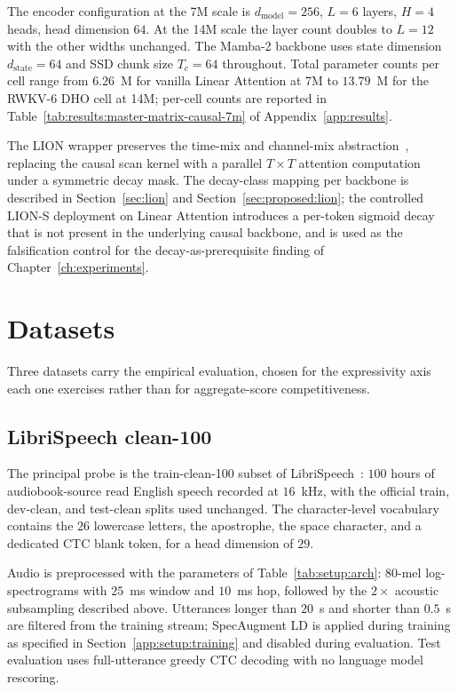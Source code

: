 The encoder configuration at the 7M scale is $d_{\text{model}} = 256$,
$L = 6$ layers, $H = 4$ heads, head dimension $64$. At the 14M
scale the layer count doubles to $L = 12$ with the other widths
unchanged. The Mamba-2 backbone uses state dimension
$d_{\text{state}} = 64$ and SSD chunk size $T_{c} = 64$ throughout.
Total parameter counts per cell range from $6.26$~M for vanilla
Linear Attention at 7M to $13.79$~M for the RWKV-6 DHO cell at
14M; per-cell counts are reported in
Table~\ref{tab:results:master-matrix-causal-7m} of
Appendix~\ref{app:results}.

The LION wrapper preserves the time-mix and channel-mix
abstraction~\cite{afzal2025linear}, replacing the causal scan kernel
with a parallel $T \times T$ attention computation under a symmetric
decay mask. The decay-class mapping per backbone is described in
Section~\ref{sec:lion} and Section~\ref{sec:proposed:lion}; the
controlled LION-S deployment on Linear Attention introduces a
per-token sigmoid decay that is not present in the underlying
causal backbone, and is used as the falsification control for the
decay-as-prerequisite finding of
Chapter~\ref{ch:experiments}.

\section{Datasets}\label{app:setup:datasets}

Three datasets carry the empirical evaluation, chosen for the
expressivity axis each one exercises rather than for aggregate-score
competitiveness.

\subsection{LibriSpeech clean-100}\label{app:setup:librispeech}

The principal probe is the train-clean-100 subset of
LibriSpeech~\cite{panayotov2015librispeech}: $100$ hours of
audiobook-source read English speech recorded at $16$~kHz, with the
official train, dev-clean, and test-clean splits used unchanged.
The character-level vocabulary contains the $26$ lowercase letters,
the apostrophe, the space character, and a dedicated CTC blank
token, for a head dimension of $29$.

Audio is preprocessed with the parameters of
Table~\ref{tab:setup:arch}: $80$-mel log-spectrograms with $25$~ms
window and $10$~ms hop, followed by the $2\times$ acoustic
subsampling described above. Utterances longer than $20$~s and
shorter than $0.5$~s are filtered from the training stream;
SpecAugment LD is applied during training as specified in
Section~\ref{app:setup:training} and disabled during evaluation.
Test evaluation uses full-utterance greedy CTC decoding with no
language model rescoring.

